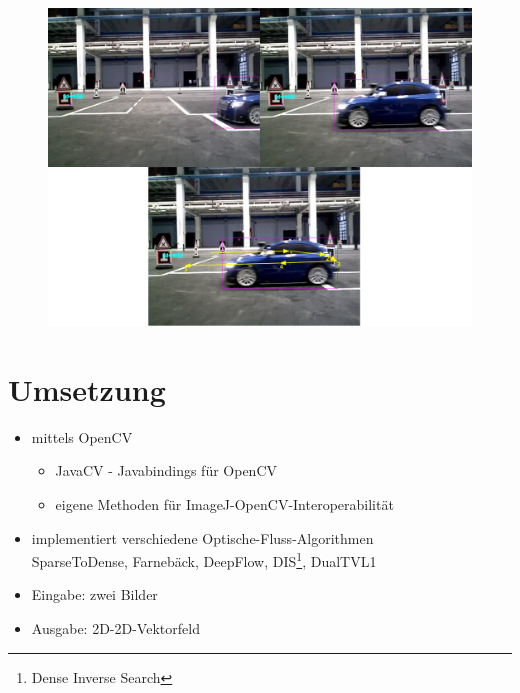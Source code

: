 \documentclass[10pt]{beamer}
\begin{document}
\begin{frame}

	\begin{figure}[h]
	\centering
	\includegraphics[scale=0.2]{./Abbildungen/08.png}
	\label{img:bsp4}
	\end{figure}

\end{frame}

\section{Umsetzung}
\begin{frame}{\secname}
	
	\begin{itemize}
	
		\item mittels OpenCV
		\begin{itemize}
			\item JavaCV - Javabindings für OpenCV
			\item eigene Methoden für ImageJ-OpenCV-Interoperabilität
		\end{itemize}
		\item implementiert verschiedene Optische-Fluss-Algorithmen
			\\ SparseToDense, Farnebäck, DeepFlow, DIS\footnote{Dense Inverse Search}, DualTVL1
		\item Eingabe: zwei Bilder
		\item Ausgabe: 2D-2D-Vektorfeld
		
	\end{itemize}		
	
\end{frame}
\end{document}
